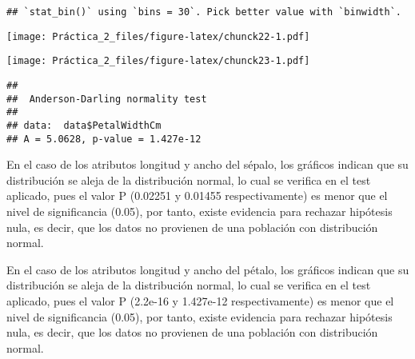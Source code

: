 \documentclass[
]{article}
\newenvironment{Shaded}{\begin{snugshade}}{\end{snugshade}}
\newcommand{\AttributeTok}[1]{\textcolor[rgb]{0.77,0.63,0.00}{#1}}
\newcommand{\CommentTok}[1]{\textcolor[rgb]{0.56,0.35,0.01}{\textit{#1}}}
\newcommand{\FunctionTok}[1]{\textcolor[rgb]{0.00,0.00,0.00}{#1}}
\newcommand{\NormalTok}[1]{#1}
\newcommand{\SpecialCharTok}[1]{\textcolor[rgb]{0.00,0.00,0.00}{#1}}
\begin{document}
\begin{verbatim}
## `stat_bin()` using `bins = 30`. Pick better value with `binwidth`.
\end{verbatim}

\texttt{[image: Práctica\_2\_files/figure-latex/chunck22-1.pdf]}

\begin{Shaded}
\end{Shaded}

\texttt{[image: Práctica\_2\_files/figure-latex/chunck23-1.pdf]}

\begin{Shaded}
\end{Shaded}

\begin{verbatim}
## 
##  Anderson-Darling normality test
## 
## data:  data$PetalWidthCm
## A = 5.0628, p-value = 1.427e-12
\end{verbatim}

En el caso de los atributos longitud y ancho del sépalo, los gráficos
indican que su distribución se aleja de la distribución normal, lo cual
se verifica en el test aplicado, pues el valor P (0.02251 y 0.01455
respectivamente) es menor que el nivel de significancia (0.05), por
tanto, existe evidencia para rechazar hipótesis nula, es decir, que los
datos no provienen de una población con distribución normal.

En el caso de los atributos longitud y ancho del pétalo, los gráficos
indican que su distribución se aleja de la distribución normal, lo cual
se verifica en el test aplicado, pues el valor P (2.2e-16 y 1.427e-12
respectivamente) es menor que el nivel de significancia (0.05), por
tanto, existe evidencia para rechazar hipótesis nula, es decir, que los
datos no provienen de una población con distribución normal.
\end{document}
